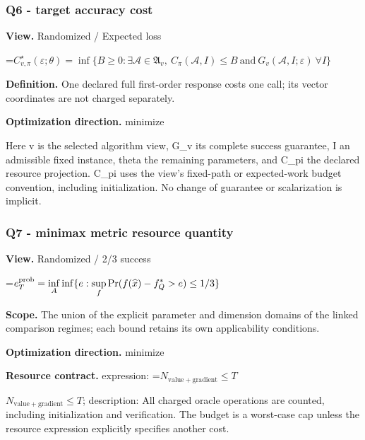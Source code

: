 \documentclass[10pt,a4paper]{article}
\newcommand{\AtlasMath}[1]{\par\begingroup\centering\setbox0=\hbox{$\displaystyle #1$}\ifdim\wd0>1.4\linewidth\typeout{ATLAS WIDE FORMULA: \the\wd0}\fi\ifdim\wd0>\linewidth\resizebox{\linewidth}{!}{\box0}\else\box0\fi\par\endgroup}
\newcommand{\AtlasInlineMath}[1]{\begingroup\setbox0=\hbox{$#1$}\ifdim\wd0>.4\linewidth\endgroup\AtlasMath{#1}\else\endgroup$#1$\fi}
\begin{document}
\subsubsection{Q6 - target accuracy cost}


\textbf{View.} Randomized / Expected loss



\AtlasMath{C^\star_{v,\pi}(\varepsilon;\theta)=\inf\{B\ge0:\exists\mathcal A\in\mathfrak A_v,\ C_\pi(\mathcal A,I)\le B\ \text{and}\ G_v(\mathcal A,I;\varepsilon)\ \forall I\}}


\textbf{Definition.} One declared full first-order response costs one call; its vector coordinates are not charged separately.



\textbf{Optimization direction.} minimize



Here v is the selected algorithm view, G\_v its complete success guarantee, I an admissible fixed instance, theta the remaining parameters, and C\_pi the declared resource projection. C\_pi uses the view's fixed-path or expected-work budget convention, including initialization. No change of guarantee or scalarization is implicit.



\subsubsection{Q7 - minimax metric resource quantity}


\textbf{View.} Randomized / 2/3 success



\AtlasMath{e_T^{\rm prob}=\inf_A\inf\{e:\sup_f\Pr(f(\widehat x)-f_Q^*>e)\le1/3\}}


\textbf{Scope.} The union of the explicit parameter and dimension domains of the linked comparison regimes; each bound retains its own applicability conditions.



\textbf{Optimization direction.} minimize



\textbf{Resource contract.} expression: \AtlasInlineMath{N_{\mathrm{value+gradient}}\le T}; description: All charged oracle operations are counted, including initialization and verification. The budget is a worst-case cap unless the resource expression explicitly specifies another cost.
\end{document}

